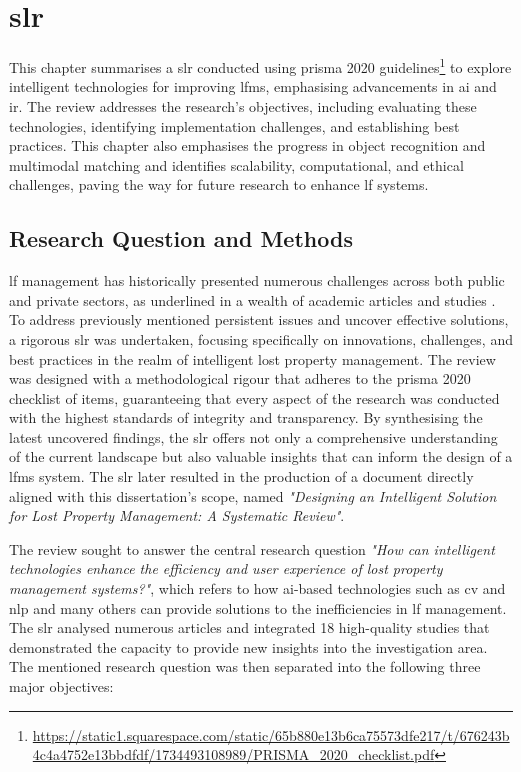 \chapter{\acl{slr}}
\label{chapter:literature-review}

This chapter summarises a \ac{slr} conducted using \ac{prisma} 2020 \cite{Page2021} guidelines\footnote{\url{https://static1.squarespace.com/static/65b880e13b6ca75573dfe217/t/676243b4c4a4752e13bbdfdf/1734493108989/PRISMA_2020_checklist.pdf}} to explore intelligent technologies for improving \ac{lfms}, emphasising advancements in \ac{ai} and \ac{ir}. The review addresses the research's objectives, including evaluating these technologies, identifying implementation challenges, and establishing best practices. This chapter also emphasises the progress in object recognition and multimodal matching and identifies scalability, computational, and ethical challenges, paving the way for future research to enhance \ac{lf} systems.

\section{Research Question and Methods} \label{subsec:slr}

\ac{lf} management has historically presented numerous challenges across both public and private sectors, as underlined in a wealth of academic articles and studies \cite{Prawira2024}. To address previously mentioned persistent issues and uncover effective solutions, a rigorous \ac{slr} was undertaken, focusing specifically on innovations, challenges, and best practices in the realm of intelligent lost property management. The review was designed with a methodological rigour that adheres to the \ac{prisma} 2020 checklist of items, guaranteeing that every aspect of the research was conducted with the highest standards of integrity and transparency. By synthesising the latest uncovered findings, the \ac{slr} offers not only a comprehensive understanding of the current landscape but also valuable insights that can inform the design of a \ac{lfms} system. The \ac{slr} later resulted in the production of a document directly aligned with this dissertation's scope, named \textit{"Designing an Intelligent Solution for Lost Property Management: A Systematic Review"}.

The review sought to answer the central research question \textit{"How can intelligent technologies enhance the efficiency and user experience of lost property management systems?"}, which refers to how \ac{ai}-based technologies such as \ac{cv} and \ac{nlp} and many others can provide solutions to the inefficiencies in \ac{lf} management. The \ac{slr} analysed numerous articles and integrated 18 high-quality studies that demonstrated the capacity to provide new insights into the investigation area. The mentioned research question was then separated into the following three major objectives:


